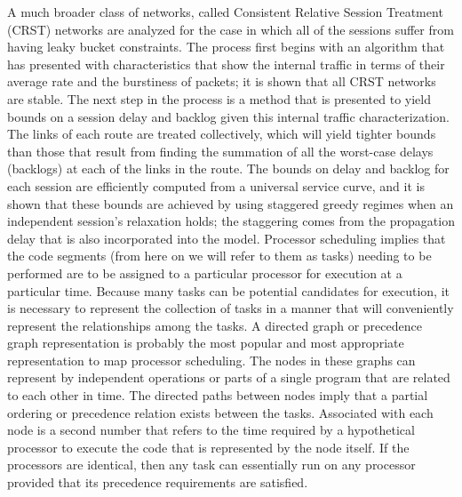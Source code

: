 \documentclass{sigcomm-alternate}
\begin{document}
A much broader class of networks, called Consistent Relative Session Treatment (CRST) networks are analyzed for the case in which all of the sessions suffer from having leaky bucket constraints. The process first begins with an algorithm that has presented with characteristics that show the internal traffic in terms of their average rate and the burstiness of packets; it is shown that all CRST networks are stable. The next step in the process is a method that is presented to yield bounds on a session delay and backlog given this internal traffic characterization. The links of each route are treated collectively, which will yield tighter bounds than those that result from finding the summation of all the worst-case delays (backlogs) at each of the links in the route. The bounds on delay and backlog for each session are efficiently computed from a universal service curve, and it is shown that these bounds are achieved by using staggered greedy regimes when an independent session's relaxation holds;  the staggering comes from the propagation delay that is also incorporated into the model.
Processor scheduling implies that the code segments (from here on we will refer to them as tasks) needing to be performed are to be assigned to a particular processor for execution at a particular time. Because many tasks can be potential candidates for execution, it is necessary to represent the collection of tasks in a manner that will conveniently represent the relationships among the tasks. A directed graph or precedence graph representation is probably the most popular and most appropriate representation to map processor scheduling. The nodes in these graphs can represent by independent operations or parts of a single program that are related to each other in time. The directed paths between nodes imply that a partial ordering or precedence relation exists between the tasks. Associated with each node is a second number that refers to the time required by a hypothetical processor to execute the code that is represented by the node itself. If the processors are identical, then any task can essentially run on any processor provided that its precedence requirements are satisfied. 
\end{document}

